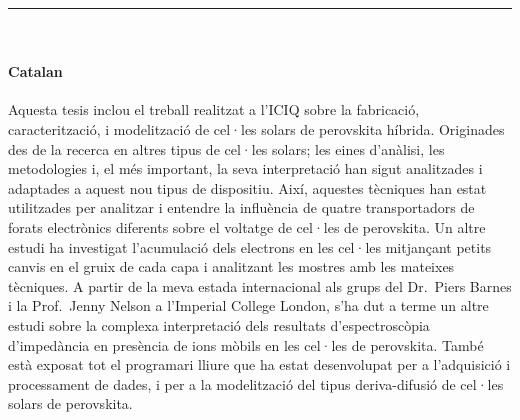 {
	\vfill
	\centering \rule{5cm}{1pt}\\
	\vfill
}

\EnableQuotes
\noindent

\paragraph{Catalan}

Aquesta tesis inclou el treball realitzat a l'ICIQ sobre la fabricació, caracterització, i modelització de cel·les solars de perovskita híbrida.
Originades des de la recerca en altres tipus de cel·les solars; les eines d'anàlisi, les metodologies i, el més important, la seva interpretació han sigut analitzades i adaptades a aquest nou tipus de dispositiu.
Així, aquestes tècniques han estat utilitzades per analitzar i entendre la influència de quatre transportadors de forats electrònics diferents sobre el voltatge de cel·les de perovskita.
Un altre estudi ha investigat l'acumulació dels electrons en les cel·les mitjançant petits canvis en el gruix de cada capa i analitzant les mostres amb les mateixes tècniques.
A partir de la meva estada internacional als grups del Dr.\ Piers Barnes i la Prof.\ Jenny Nelson a l'Imperial College London, s'ha dut a terme un altre estudi sobre la complexa interpretació dels resultats d'espectroscòpia d'impedància en presència de ions mòbils en les cel·les de perovskita.
També està exposat tot el programari lliure que ha estat desenvolupat per a l'adquisició i processament de dades, i per a la modelització del tipus deriva-difusió de cel·les solars de perovskita.

\vfill

\EnableQuotes